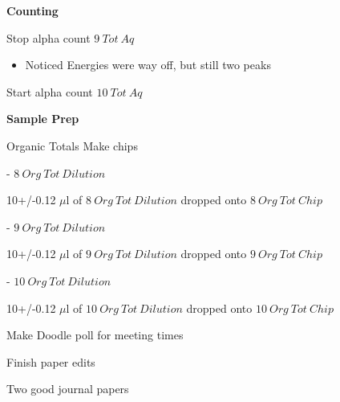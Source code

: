 \documentclass[idxtotoc,hyperref,openany,oneside]{labbook} %
\newcommand{\cmark}{\ding{51}}%
\newcommand{\done}{\rlap{$\square$}{\raisebox{2pt}{\large\hspace{1pt}\cmark}}%
  \hspace{-2.5pt}}
\begin{document}
\textbf{Counting}
\begin{todolist}
\item[\done]{Stop alpha count $\boxed{9\ Tot\ Aq}$}
  \begin{itemize}
  \item{Noticed Energies were way off, but still two peaks}
  \end{itemize}
\item[\done]{Start alpha count $\boxed{10\ Tot\ Aq}$}
\end{todolist}

\textbf{Sample Prep}

\begin{todolist}
\item[\done]{Organic Totals Make chips}

  \begin{todolist}
  \item[\done]{- $\boxed{8\ Org\ Tot\ Dilution}$}
  \end{todolist}
  \vspace{0.3cm}
  \begin{center}
    10+/-0.12 $\mu$l of $\boxed{8\ Org\ Tot\ Dilution}$ dropped onto
    $\boxed{8\ Org\ Tot\ Chip}$
  \end{center}
  
  \begin{todolist}
  \item[\done]{- $\boxed{9\ Org\ Tot\ Dilution}$}
  \end{todolist}
  \vspace{0.3cm}
  \begin{center}
    10+/-0.12 $\mu$l of $\boxed{9\ Org\ Tot\ Dilution}$ dropped onto
    $\boxed{9\ Org\ Tot\ Chip}$
  \end{center}

  \begin{todolist}
  \item[\done]{- $\boxed{10\ Org\ Tot\ Dilution}$}
  \end{todolist}
  \vspace{0.3cm}
  \begin{center}
    10+/-0.12 $\mu$l of $\boxed{10\ Org\ Tot\ Dilution}$ dropped onto
    $\boxed{10\ Org\ Tot\ Chip}$
  \end{center}
\end{todolist}


\begin{todolist}
\item{Make Doodle poll for meeting times}
\item{Finish paper edits}
\item{Two good journal papers}
\end{todolist}
\end{document}
